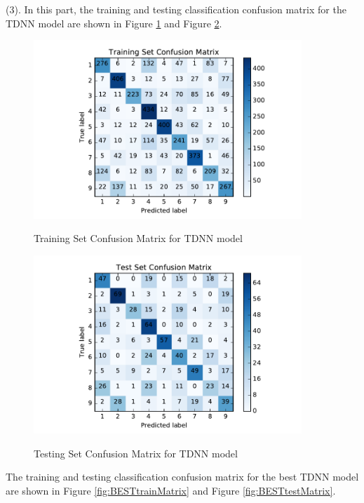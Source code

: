 (3). In this part, the training and testing classification confusion matrix for the TDNN model are shown in Figure \ref{fig:TDNNtrainMatrix} and Figure \ref{fig:TDNNtestMatrix}. 

\begin{figure}[H]
\centering
\includegraphics[width=0.9\textwidth]{./figures/requiredTDNNtrain.pdf}\
\caption{\label{fig:TDNNtrainMatrix} Training Set Confusion Matrix for TDNN model}
\end{figure}


\begin{figure}[H]
\centering
\includegraphics[width=0.9\textwidth]{./figures/requiredTDNNtest.pdf}\
\caption{\label{fig:TDNNtestMatrix} Testing Set Confusion Matrix for TDNN model}
\end{figure}


The training and testing classification confusion matrix for the best TDNN model are shown in Figure \ref{fig:BESTtrainMatrix} and Figure \ref{fig:BESTtestMatrix}. 

